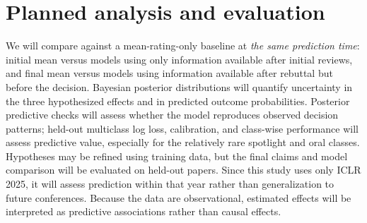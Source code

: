 \documentclass[11pt]{article}
\begin{document}
\section*{Planned analysis and evaluation}
We will compare against a mean-rating-only baseline at \emph{the same prediction time}: initial mean versus models using only information available after initial reviews, and final mean versus models using information available after rebuttal but before the decision. Bayesian posterior distributions will quantify uncertainty in the three hypothesized effects and in predicted outcome probabilities. Posterior predictive checks will assess whether the model reproduces observed decision patterns; held-out multiclass log loss, calibration, and class-wise performance will assess predictive value, especially for the relatively rare spotlight and oral classes. Hypotheses may be refined using training data, but the final claims and model comparison will be evaluated on held-out papers. Since this study uses only ICLR 2025, it will assess prediction within that year rather than generalization to future conferences. Because the data are observational, estimated effects will be interpreted as predictive associations rather than causal effects.
\end{document}
